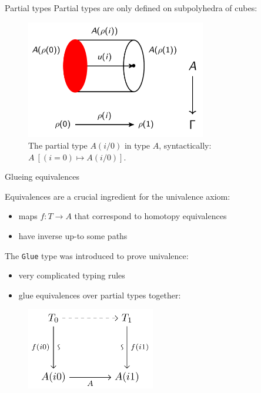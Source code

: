 \documentclass[english,draft]{beamer}
\begin{document}
\begin{frame}{Partial types} 
 Partial types are only defined on subpolyhedra of cubes:
 
 
 \begin{figure}
    \centering
  \includegraphics[width=0.7\textwidth]{figures/types_side}
  \caption{The partial type $A(i/0)$ in type $A$, syntactically: $A\ [(i = 0) \mapsto A(i/0)]$.}
 \end{figure}

 
 
\end{frame}

\begin{frame}{Glueing equivalences}
  
  Equivalences are a crucial ingredient for the univalence axiom:
  \begin{itemize}
   \item maps $f : T \rightarrow A$ that correspond to homotopy equivalences
   \item have inverse up-to some paths
  \end{itemize}

  
   The \texttt{Glue} type was introduced to prove univalence:
   \begin{itemize}
    \item very complicated typing rules
    \item glue equivalences  over partial types together:
   \end{itemize}

 
\begin{figure}
 \includegraphics[width=0.5\textwidth]{figures/glue}
\end{figure}

  
 
\end{frame}
\end{document}
